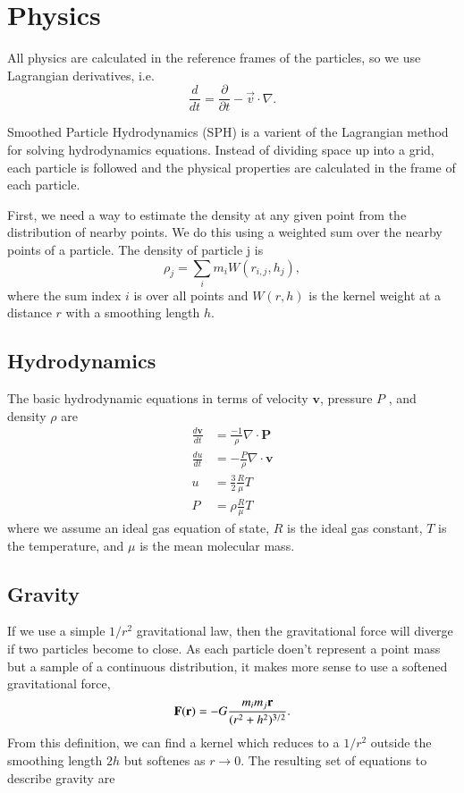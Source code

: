 \documentclass[12pt]{article}
\begin{document}
\section{Physics}
All physics are calculated in the reference frames of the particles, so we use
Lagrangian derivatives, i.e.
\begin{equation}
    \frac{d}{dt} = \frac{\partial }{\partial t} - \vec{v} \cdot \nabla .
\end{equation}

Smoothed Particle Hydrodynamics (SPH) is a varient of the Lagrangian method for solving
hydrodynamics equations. Instead of dividing space up into a grid, each particle is followed and the physical properties are calculated in the frame of each particle.

First, we need a way to estimate the density at any given point from the distribution of nearby points. We do this using a weighted sum over the nearby points of a particle. The density of particle j is
\begin{equation}
    \rho_j = \sum_{i} m_i W(r_{i,j}, h_j),
\end{equation}
where the sum index $i$ is over all points and $W(r, h)$ is the kernel weight at a distance $r$ with a smoothing length $h$. 

\subsection{Hydrodynamics}

The basic hydrodynamic equations in terms of velocity $\mathbf{v}$, pressure $P$ , and density $\rho$ are
\begin{align}
    \frac{d\mathbf{v}}{dt}&= \frac{-1}{\rho} \nabla \cdot \mathbf{P} \\
    \frac{d u}{d t} &= -\frac{P}{\rho} \nabla \cdot \mathbf{v}\\
    u &= \frac{3}{2} \frac{R}{\mu} T\\
    P &= \rho \frac{R}{\mu} T 
\end{align}
where we assume an ideal gas equation of state, $R$ is the ideal gas constant, $T$ is the temperature, and $\mu$ is the mean molecular mass.



\subsection{Gravity}

If we use a simple $1/r^2$ gravitational law, then the gravitational force will diverge if
two particles become to close. As each particle doen't represent a point mass but
a sample of a continuous distribution, it makes more sense to use a softened gravitational 
force, 
\begin{equation}
    {\bf F}(\mathbf{r}) = - G \frac{m_i m_j \mathbf{r}}{(r^2 + h^2)^{3/2}}.
\end{equation}
From this definition, we can find a kernel which reduces to a $1/r^2$ outside the smoothing
length $2h$ but softenes as $r\to0$. The resulting set of equations to describe gravity are \citep{PM07}
\end{document}

